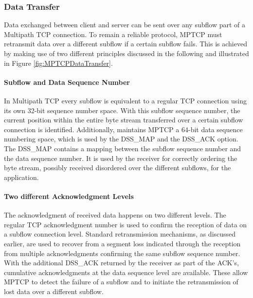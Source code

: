 \subsubsection{Data Transfer}

Data exchanged between client and server can be sent over any subflow part of a Multipath TCP connection. To remain a reliable protocol, MPTCP must retransmit data over a different subflow if a certain subflow fails. This is achieved by making use of two different principles discussed in the following and illustrated in Figure \ref{fig:MPTCPDataTransfer}.

\paragraph{Subflow and Data Sequence Number}

In Multipath TCP every subflow is equivalent to a regular TCP connection using its own 32-bit sequence number space. With this subflow sequence number, the current position within the entire byte stream transferred over a certain subflow connection is identified. Additionally, maintains MPTCP a 64-bit data sequence numbering space, which is used by the DSS\_MAP and the DSS\_ACK option. The DSS\_MAP contains a mapping between the subflow sequence number and the data sequence number. It is used by the receiver for correctly ordering the byte stream, possibly received disordered over the different subflows, for the application.

\paragraph{Two different Acknowledgment Levels}

The acknowledgment of received data happens on two different levels. The regular TCP acknowledgment number is used to confirm the reception of data on a subflow connection level. Standard retransmission mechanisms, as discussed earlier, are used to recover from a segment loss indicated through the reception from multiple acknowledgments confirming the same subflow sequence number. With the additional DSS\_ACK returned by the receiver as part of the ACK's, cumulative acknowledgments at the data sequence level are available. These allow MPTCP to detect the failure of a subflow and to initiate the retransmission of lost data over a different subflow.

